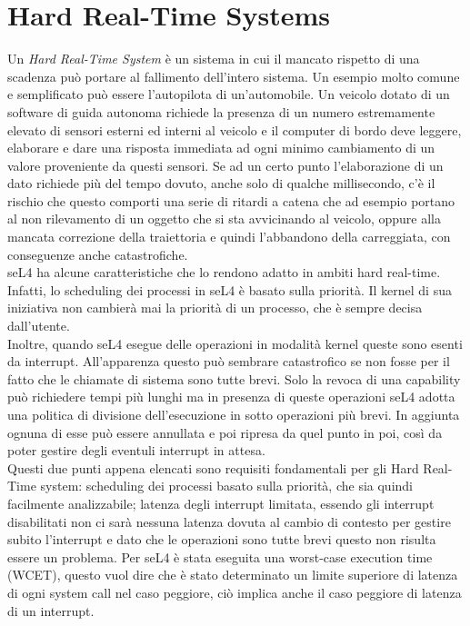 \section{Hard Real-Time Systems}
Un \textit{Hard Real-Time System} è un sistema in cui il mancato rispetto di una scadenza può portare al fallimento dell'intero sistema. Un esempio molto comune e semplificato può essere l'autopilota di un'automobile. Un veicolo dotato di un software di guida autonoma richiede la presenza di un numero estremamente elevato di sensori esterni ed interni al veicolo e il computer di bordo deve leggere, elaborare e dare una risposta immediata ad ogni minimo cambiamento di un valore proveniente da questi sensori. Se ad un certo punto l'elaborazione di un dato richiede più del tempo dovuto, anche solo di qualche millisecondo, c'è il rischio che questo comporti una serie  di ritardi a catena che ad esempio portano al non rilevamento di un oggetto che si sta avvicinando al veicolo, oppure alla mancata correzione della traiettoria e quindi l'abbandono della carreggiata, con conseguenze anche catastrofiche.\\
seL4 ha alcune caratteristiche che lo rendono adatto in ambiti hard real-time.\\
Infatti, lo scheduling dei processi in seL4 è basato sulla priorità. Il kernel di sua iniziativa non cambierà mai la priorità di un processo, che è sempre decisa dall'utente.\\
Inoltre, quando seL4 esegue delle operazioni in modalità kernel queste sono esenti da interrupt. All'apparenza questo può sembrare catastrofico se non fosse per il fatto che le chiamate di sistema sono tutte brevi. Solo la revoca di una capability può richiedere tempi più lunghi ma in presenza di queste operazioni seL4 adotta una politica di divisione dell'esecuzione in sotto operazioni più brevi. In aggiunta ognuna di esse può essere annullata e poi ripresa da quel punto in poi, così da poter gestire degli eventuli interrupt in attesa.\\
Questi due punti appena elencati sono requisiti fondamentali per gli Hard Real-Time system: scheduling dei processi basato sulla priorità, che sia quindi facilmente analizzabile; latenza degli interrupt limitata, essendo gli interrupt disabilitati non ci sarà nessuna latenza dovuta al cambio di contesto per gestire subito l'interrupt e dato che le operazioni sono tutte brevi questo non risulta essere un problema.
Per seL4 è stata eseguita una worst-case execution time (WCET), questo vuol dire che è stato determinato un limite superiore di latenza di ogni system call nel caso peggiore, ciò implica anche il caso peggiore di latenza di un interrupt.

